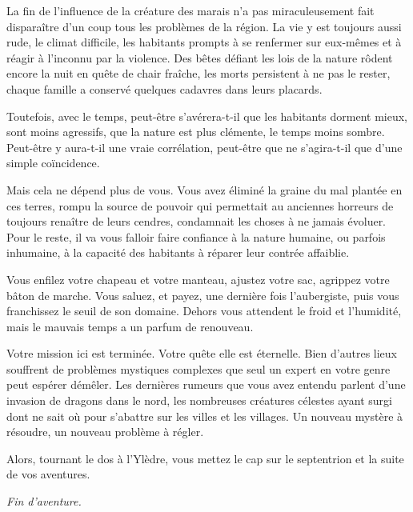 \documentclass{report}
\newcommand{\theend}{\emph{Fin d'aventure.}}
\begin{document}
La fin de l'influence de la créature des marais n'a pas miraculeusement fait disparaître d'un coup tous les problèmes de la région. La vie y est toujours aussi rude, le climat difficile, les habitants prompts à se renfermer sur eux-mêmes et à réagir à l'inconnu par la violence. Des bêtes défiant les lois de la nature rôdent encore la nuit en quête de chair fraîche, les morts persistent à ne pas le rester, chaque famille a conservé quelques cadavres dans leurs placards. 

Toutefois, avec le temps, peut-être s'avérera-t-il que les habitants dorment mieux, sont moins agressifs, que la nature est plus clémente, le temps moins sombre. Peut-être y aura-t-il une vraie corrélation, peut-être que ne s'agira-t-il que d'une simple coïncidence. 

Mais cela ne dépend plus de vous. Vous avez éliminé la graine du mal plantée en ces terres, rompu la source de pouvoir qui permettait au anciennes horreurs de toujours renaître de leurs cendres, condamnait les choses à ne jamais évoluer. Pour le reste, il va vous falloir faire confiance à la nature humaine, ou parfois inhumaine, à la capacité des habitants à réparer leur contrée affaiblie. 

Vous enfilez votre chapeau et votre manteau, ajustez votre sac, agrippez votre bâton de marche. Vous saluez, et payez, une dernière fois l'aubergiste, puis vous franchissez le seuil de son domaine. Dehors vous attendent le froid et l'humidité, mais le mauvais temps a un parfum de renouveau. 

Votre mission ici est terminée. Votre quête elle est éternelle. Bien d'autres lieux souffrent de problèmes mystiques complexes que seul un expert en votre genre peut espérer démêler. Les dernières rumeurs que vous avez entendu parlent d'une invasion de dragons dans le nord, les nombreuses créatures célestes ayant surgi dont ne sait où pour s'abattre sur les villes et les villages. Un nouveau mystère à résoudre, un nouveau problème à régler. 

Alors, tournant le dos à l'Ylèdre, vous mettez le cap sur le septentrion et la suite de vos aventures.

\theend
\end{document}
